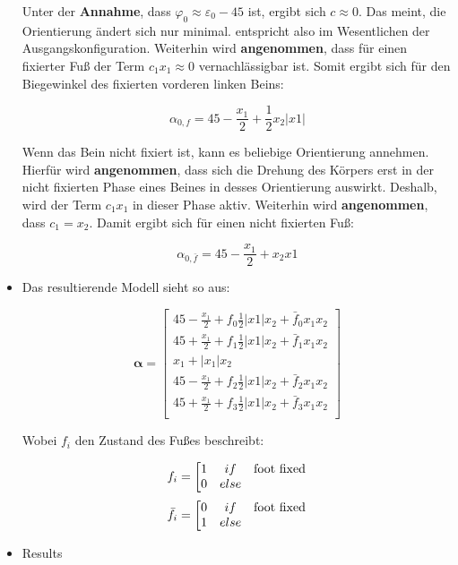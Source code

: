 \documentclass[10pt,a4paper]{article}
\begin{document}
\begin{itemize}
Unter der \textbf{Annahme}, dass $\varphi_0 \approx \varepsilon_0 - 45$ ist, ergibt sich $c \approx 0$. Das meint, die Orientierung ändert sich nur minimal. entspricht also im Wesentlichen der Ausgangskonfiguration.
Weiterhin wird \textbf{angenommen}, dass für einen fixierter Fuß der Term $c_1x_1 \approx 0$ vernachlässigbar ist.
Somit ergibt sich für den Biegewinkel des fixierten vorderen linken Beins:

\begin{equation}
\alpha_{0,f} = 45-\frac{x_1}{2} + \frac{1}{2}x_2|x1|
\end{equation}

Wenn das Bein nicht fixiert ist, kann es beliebige Orientierung annehmen.
Hierfür wird \textbf{angenommen}, dass sich die Drehung des Körpers erst in der nicht fixierten Phase eines Beines in desses Orientierung auswirkt.
Deshalb, wird der Term $c_1x_1$ in dieser Phase aktiv.
Weiterhin wird \textbf{angenommen}, dass $c_1 = x_2$. Damit ergibt sich für einen nicht fixierten Fuß:

\begin{equation}
\alpha_{0,\bar{f}} = 45-\frac{x_1}{2} + x_2x1
\end{equation}


\item Das resultierende Modell sieht so aus:

\begin{equation}
\bm{\alpha} = \begin{bmatrix}
45 - \frac{x_1}{2}+ f_0\frac{1}{2}|x1|x_2  + \bar{f}_0x_1x_2  \\
45 + \frac{x_1}{2} + f_1\frac{1}{2}|x1|x_2+ \bar{f}_1x_1x_2  \\
x_1 + |x_1|x_2 \\
45 - \frac{x_1}{2}  + f_2\frac{1}{2}|x1|x_2 + \bar{f}_2x_1x_2\\
45 + \frac{x_1}{2}  + f_3\frac{1}{2}|x1|x_2+ \bar{f}_3x_1x_2 \\
\end{bmatrix}
\end{equation}

Wobei $f_i$ den Zustand des Fußes beschreibt:

\begin{equation}
f_i = \left[
\begin{matrix}
1 & if & \textnormal{foot fixed} \\ 
0 & else& \\
\end{matrix} \right.
\end{equation}
\begin{equation}
\bar{f}_i = \left[
\begin{matrix}
0 & if& \textnormal{foot fixed} \\ 
1 & else& \\
\end{matrix} \right.
\end{equation}

\item Results
\end{itemize}
\end{document}
